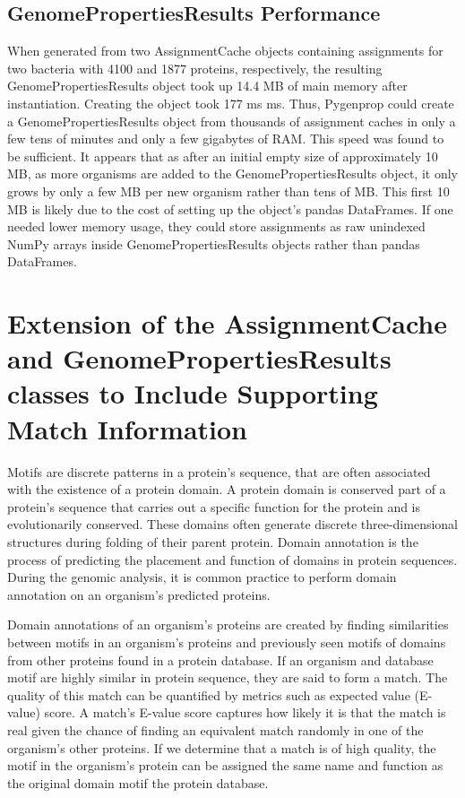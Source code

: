 \subsection{GenomePropertiesResults Performance}

When generated from two AssignmentCache objects containing assignments for two bacteria with 4100 and 1877 proteins, respectively, the resulting GenomePropertiesResults object took up 14.4 MB of main memory after instantiation. Creating the object took 177 ms  ms. Thus, Pygenprop could create a GenomePropertiesResults object from thousands of assignment caches in only a few tens of minutes and only a few gigabytes of RAM. This speed was found to be sufficient. It appears that as after an initial empty size of approximately 10 MB, as more organisms are added to the GenomePropertiesResults object, it only grows by only a few MB per new organism rather than tens of MB. This first 10 MB is likely due to the cost of setting up the object's pandas DataFrames. If one needed lower memory usage, they could store assignments as raw unindexed NumPy arrays inside GenomePropertiesResults objects rather than pandas DataFrames. 

\section{Extension of the AssignmentCache and GenomePropertiesResults classes to Include Supporting Match Information}

Motifs are discrete patterns in a protein's sequence, that are often associated with the existence of a protein domain. A protein domain is conserved part of a protein's sequence that carries out a specific function for the protein and is evolutionarily conserved. These domains often generate discrete three-dimensional structures during folding of their parent protein. Domain annotation is the process of predicting the placement and function of domains in protein sequences. During the genomic analysis, it is common practice to perform domain annotation on an organism's predicted proteins.

Domain annotations of an organism's proteins are created by finding similarities between motifs in an organism's proteins and previously seen motifs of domains from other proteins found in a protein database. If an organism and database motif are highly similar in protein sequence, they are said to form a match. The quality of this match can be quantified by metrics such as expected value (E-value) score. A match's E-value score captures how likely it is that the match is real given the chance of finding an equivalent match randomly in one of the organism's other proteins. If we determine that a match is of high quality, the motif in the organism's protein can be assigned the same name and function as the original domain motif the protein database.


